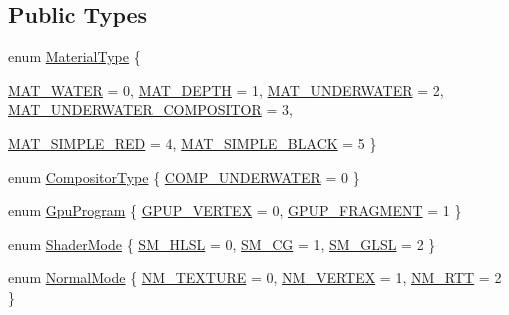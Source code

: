 \subsection*{Public Types}
\begin{CompactItemize}
\item 
enum \hyperlink{class_hydrax_1_1_material_manager_cffd193405105e0f9f528cee40fdad15}{MaterialType} \{ \par
\hyperlink{class_hydrax_1_1_material_manager_cffd193405105e0f9f528cee40fdad158be9437314fc4fd234dd1a301c83f18b}{MAT\_\-WATER} =  0, 
\hyperlink{class_hydrax_1_1_material_manager_cffd193405105e0f9f528cee40fdad15a798a1691e6dbc4c2d5659a07a40a550}{MAT\_\-DEPTH} =  1, 
\hyperlink{class_hydrax_1_1_material_manager_cffd193405105e0f9f528cee40fdad1528b9ef4add78a3123ebe89b359d83fd2}{MAT\_\-UNDERWATER} =  2, 
\hyperlink{class_hydrax_1_1_material_manager_cffd193405105e0f9f528cee40fdad15f4afa6e811eb429b8574c474c6724839}{MAT\_\-UNDERWATER\_\-COMPOSITOR} =  3, 
\par
\hyperlink{class_hydrax_1_1_material_manager_cffd193405105e0f9f528cee40fdad1591cefab31636702f3baa4d881c738cd5}{MAT\_\-SIMPLE\_\-RED} =  4, 
\hyperlink{class_hydrax_1_1_material_manager_cffd193405105e0f9f528cee40fdad15869a833addc3c1b2b8ef51f744ad8844}{MAT\_\-SIMPLE\_\-BLACK} =  5
 \}
\item 
enum \hyperlink{class_hydrax_1_1_material_manager_9ec2b5e6a97ef7589119e888a7a32174}{CompositorType} \{ \hyperlink{class_hydrax_1_1_material_manager_9ec2b5e6a97ef7589119e888a7a32174e293175314a47d86f40b5d420ae93a50}{COMP\_\-UNDERWATER} =  0
 \}
\item 
enum \hyperlink{class_hydrax_1_1_material_manager_a0cfb2fce7a409771c0751d04afa2514}{GpuProgram} \{ \hyperlink{class_hydrax_1_1_material_manager_a0cfb2fce7a409771c0751d04afa25143e19dcf6ea6c0af8fe857109b61b6966}{GPUP\_\-VERTEX} =  0, 
\hyperlink{class_hydrax_1_1_material_manager_a0cfb2fce7a409771c0751d04afa2514725c22f2a07b494c9da5ea2516f6bdf3}{GPUP\_\-FRAGMENT} =  1
 \}
\item 
enum \hyperlink{class_hydrax_1_1_material_manager_cb13fe494b6960a96270e1ac293c48fb}{ShaderMode} \{ \hyperlink{class_hydrax_1_1_material_manager_cb13fe494b6960a96270e1ac293c48fbfe9388495224c135afda753e1ae1cfa0}{SM\_\-HLSL} =  0, 
\hyperlink{class_hydrax_1_1_material_manager_cb13fe494b6960a96270e1ac293c48fbd7af4bdac1838ded2dd21e0361fcacad}{SM\_\-CG} =  1, 
\hyperlink{class_hydrax_1_1_material_manager_cb13fe494b6960a96270e1ac293c48fbb413fe409a75826d1391e08ec1baf1ba}{SM\_\-GLSL} =  2
 \}
\item 
enum \hyperlink{class_hydrax_1_1_material_manager_aa14689cd1c259f48954dfecda9b296f}{NormalMode} \{ \hyperlink{class_hydrax_1_1_material_manager_aa14689cd1c259f48954dfecda9b296f67cb32d1d64c054eb1006ff2d85bd4c0}{NM\_\-TEXTURE} =  0, 
\hyperlink{class_hydrax_1_1_material_manager_aa14689cd1c259f48954dfecda9b296ffe4d6257f673cf503a9905fb2576288f}{NM\_\-VERTEX} =  1, 
\hyperlink{class_hydrax_1_1_material_manager_aa14689cd1c259f48954dfecda9b296fcd0d7beee24621a3a3fe47dcdf64d553}{NM\_\-RTT} =  2
 \}

\end{CompactItemize}
